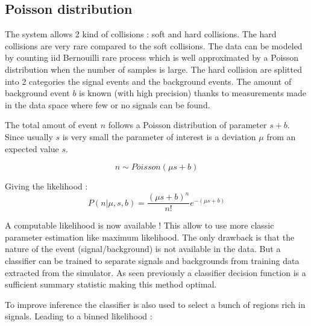 





\subsection{Poisson distribution} %
\label{sub:poisson_distribution}

The system allows 2 kind of collisions : soft and hard collisions.
The hard collisions are very rare compared to the soft collisions.
The data can be modeled by counting iid Bernouilli rare process which is well approximated by a Poisson distribution \needcite when the number of samples is large.
The hard collision are splitted into 2 categories the signal events and the background events.
The amount of background event $b$ is known (with high precision) thanks to measurements made in the data space where few or no signals can be found.

The total amout of event $n$ follows a Poisson distribution of parameter $s + b$.
Since usually $s$ is very small the parameter of interest is a deviation $\mu$ from an expected value $s$.

\begin{equation}
	n \sim Poisson(\mu s + b)
\end{equation}

Giving the likelihood :
\begin{equation}
	P(n| \mu, s, b) = \frac{(\mu s +b)^n }{n!} e^{-(\mu s + b)}
\end{equation}

A computable likelihood is now available !
This allow to use more classic parameter estimation like maximum likelihood.
The only drawback is that the nature of the event (signal/background) is not available in the data.
But a classifier can be trained to separate signals and backgrounds from training data extracted from the simulator.
As seen previously a classifier decision function is a sufficient summary statistic making this method optimal.

To improve inference the classifier is also used to select a bunch of regions rich in signals.
Leading to a binned likelihood :

